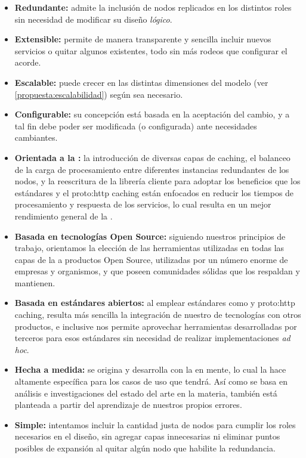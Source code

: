 \begin{itemize}
  \item \textbf{Redundante:} admite la inclusión de nodos replicados en los distintos roles sin necesidad de modificar su diseño \textit{lógico}.
  \item \textbf{Extensible:} permite de manera transparente y sencilla incluir nuevos servicios o quitar algunos existentes, todo sin más rodeos que configurar el  acorde.
  \item \textbf{Escalable:} puede crecer en las distintas dimensiones del modelo  (ver \autoref{propuesta:escalabilidad}) según sea necesario.
  \item \textbf{Configurable:} su concepción está basada en la aceptación del cambio, y a tal fin debe poder ser modificada (o configurada) ante necesidades cambiantes.
  \item \textbf{Orientada a la :} la introducción de diversas capas de caching, el balanceo de la carga de procesamiento entre diferentes instancias redundantes de los nodos, y la reescritura de la librería cliente para adoptar los beneficios que los estándares y el \gls{proto:http} caching están enfocados en reducir los tiempos de procesamiento y respuesta de los servicios, lo cual resulta en un mejor rendimiento general de la {\cloud}.
  \item \textbf{Basada en tecnologías Open Source:} siguiendo nuestros principios de trabajo, orientamos la elección de las herramientas utilizadas en todas las capas de la {\cloud} a productos Open Source, utilizadas por un número enorme de empresas y organismos, y que poseen comunidades sólidas que los respaldan y mantienen.
  \item \textbf{Basada en estándares abiertos:} al emplear estándares como  y \gls{proto:http} caching, resulta más sencilla la integración de nuestro  de tecnologías con otros productos, e inclusive nos permite aprovechar herramientas desarrolladas por terceros para esos estándares sin necesidad de realizar implementaciones \textit{ad hoc}.
  \item \textbf{Hecha a medida:} se origina y desarrolla con la {\cloud} en mente, lo cual la hace altamente específica para los casos de uso que tendrá. Así como se basa en análisis e investigaciones del estado del arte en la materia, también está planteada a partir del aprendizaje de nuestros propios errores.
  \item \textbf{Simple:} intentamos incluir la cantidad justa de nodos para cumplir los roles necesarios en el diseño, sin agregar capas innecesarias ni eliminar puntos posibles de expansión al quitar algún nodo que habilite la redundancia.

\end{itemize}
